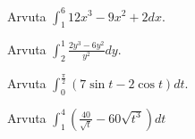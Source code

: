 \documentclass{memoir}
\begin{document}
	\begin{vplace}[1]
			\noindent Arvuta $\int_1^6 12x^3-9x^2+2dx$.
	\end{vplace}
	\pagebreak
	\pagebreak
	\begin{vplace}[1]
	\end{vplace}
	\pagebreak
	\pagebreak
	\noindent
	\begin{vplace}[1]
		\noindent Arvuta $\int_2^1 \frac{2y^3-6y^2}{y^2}dy$.
	\end{vplace}
	\pagebreak
	\pagebreak
	\noindent
	\begin{vplace}[1]
	\end{vplace}
	\pagebreak
	\pagebreak
	\noindent
	\begin{vplace}[1]
		\noindent Arvuta $\int_0^{\frac{\pi}{2}}(7\sin t-2\cos t)dt$.
	\end{vplace}
	\pagebreak
	\pagebreak
	\noindent
	\begin{vplace}[1]
	\end{vplace}
	\pagebreak
	\pagebreak
	\noindent
	\begin{vplace}[1]
		\noindent Arvuta $\int_1^4\left(\frac{40}{\sqrt{t}}-60\sqrt{t^3}\right)dt$
	\end{vplace}
	\pagebreak
\end{document}
